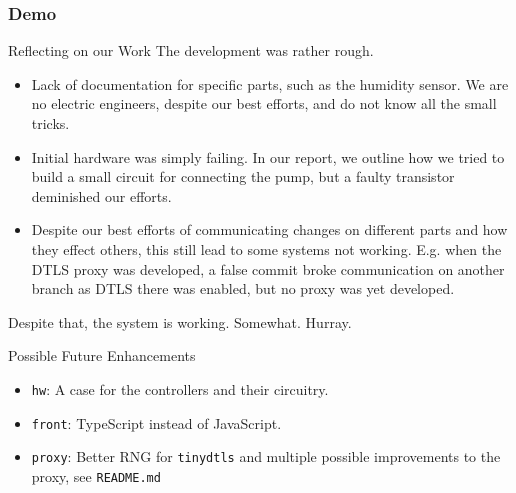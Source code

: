 \documentclass[10pt, xcolor=svgnames]{beamer}
\begin{document}
\begin{frame}
    \frametitle{Demo}

    

\end{frame}

\begin{frame}{Reflecting on our Work}
    The development was rather rough.
    \begin{itemize}
        \item Lack of documentation for specific parts, such as the humidity sensor. We are no electric engineers, despite our best efforts, and do not know all the small tricks.
        \item Initial hardware was simply failing. In our report, we outline how we tried to build a small circuit for connecting the pump, but a faulty transistor deminished our efforts.
        \item Despite our best efforts of communicating changes on different parts and how they effect others, this still lead to some systems not working. E.g. when the DTLS proxy was developed, a false commit broke communication on another branch as DTLS there was enabled, but no proxy was yet developed.
    \end{itemize}

    Despite that, the system is working. Somewhat. Hurray.
\end{frame}

\begin{frame}{Possible Future Enhancements}
    \begin{itemize}
        \item \texttt{hw}: A case for the controllers and their circuitry.
        \item \texttt{front}: TypeScript instead of JavaScript.
        \item \texttt{proxy}: Better RNG for \texttt{tinydtls} and multiple possible improvements to the proxy, see \texttt{README.md}
    \end{itemize}
\end{frame}
\end{document}
